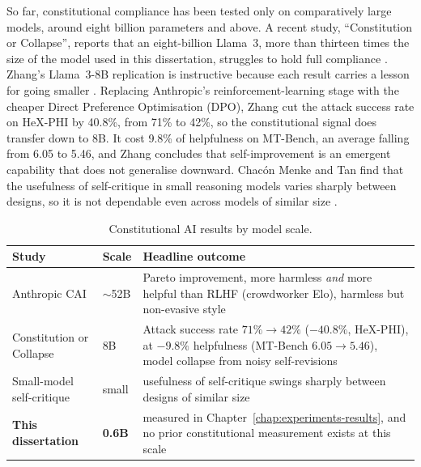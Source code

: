 So far, constitutional compliance has been tested only on comparatively large models, around eight billion parameters and above. A recent study, ``Constitution or Collapse'', reports that an eight-billion Llama~3, more than thirteen times the size of the model used in this dissertation, struggles to hold full compliance \cite{zhang2025constitutioncollapseexploringconstitutional}. Zhang's Llama~3-8B replication is instructive because each result carries a lesson for going smaller \cite{zhang2025constitutioncollapseexploringconstitutional}. Replacing Anthropic's reinforcement-learning stage with the cheaper Direct Preference Optimisation (DPO), Zhang cut the attack success rate on HeX-PHI by 40.8\%, from 71\% to 42\%, so the constitutional signal does transfer down to 8B. It cost 9.8\% of helpfulness on MT-Bench, an average falling from 6.05 to 5.46, and Zhang concludes that self-improvement is an emergent capability that does not generalise downward. Chac\'on Menke and Tan find that the usefulness of self-critique in small reasoning models varies sharply between designs, so it is not dependable even across models of similar size \cite{menke2025effectiveconstitutionalaismall}.

\begin{table}[t]
  \centering
  \caption{Constitutional AI results by model scale.}
  \label{tab:cai-at-scale}
  \begin{tabular}{p{5.4cm}p{1.5cm}p{8.5cm}}
    \hline
    Study & Scale & Headline outcome \\
    \hline
    Anthropic CAI \cite{bai2022constitutionalaiharmlessnessai} & $\sim$52B &
      Pareto improvement, more harmless \emph{and} more helpful than RLHF
      (crowdworker Elo), harmless but non-evasive style \\
    Constitution or Collapse \cite{zhang2025constitutioncollapseexploringconstitutional} & 8B &
      Attack success rate $71\% \to 42\%$ ($-40.8\%$, HeX-PHI), at $-9.8\%$
      helpfulness (MT-Bench $6.05 \to 5.46$), model collapse from noisy
      self-revisions \\
    Small-model self-critique \cite{menke2025effectiveconstitutionalaismall} & small &
      usefulness of self-critique swings sharply between designs of similar size \\
    \textbf{This dissertation} & \textbf{0.6B} & measured in
      Chapter~\ref{chap:experiments-results}, and no prior constitutional
      measurement exists at this scale \\
    \hline
  \end{tabular}
\end{table}

